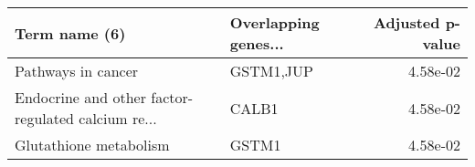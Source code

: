 \begin{tabular}{llr}
\toprule
                                     Term name (6) & Overlapping genes... &  Adjusted p-value \\
\midrule
                                Pathways in cancer &            GSTM1,JUP &          4.58e-02 \\
Endocrine and other factor-regulated calcium re... &                CALB1 &          4.58e-02 \\
                            Glutathione metabolism &                GSTM1 &          4.58e-02 \\
\bottomrule
\end{tabular}
